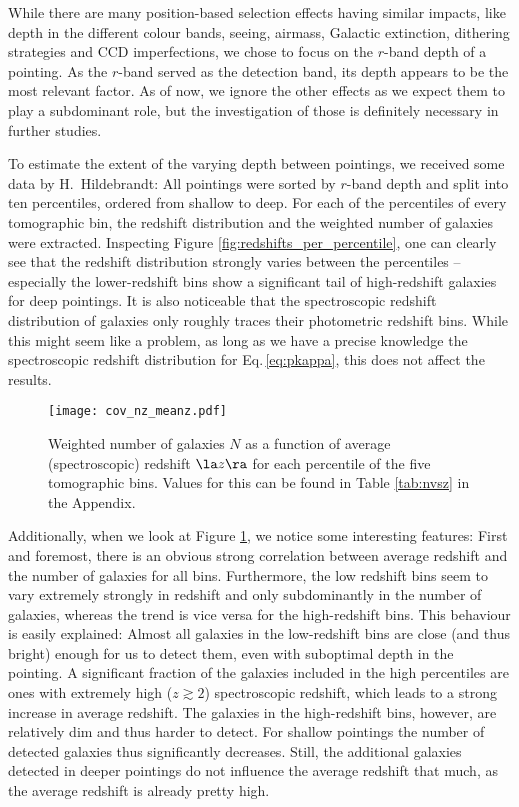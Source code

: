 While there are many position-based selection effects having similar impacts, like depth in the different colour bands, seeing, airmass, Galactic extinction, dithering strategies and CCD imperfections, we chose to focus on the $r$-band depth of a pointing. As the $r$-band served as the detection band, its depth appears to be the most relevant factor. As of now, we ignore the other effects as we expect them to play a subdominant role, but the investigation of those is definitely necessary in further studies.

To estimate the extent of the varying depth between pointings, we received some data by H.~Hildebrandt: All pointings were sorted by $r$-band depth and split into ten percentiles, ordered from shallow to deep. For each of the percentiles of every tomographic bin, the redshift distribution and the weighted number of galaxies were extracted. Inspecting Figure \ref{fig:redshifts_per_percentile}, one can clearly see that the redshift distribution strongly varies between the percentiles -- especially the lower-redshift bins show a significant tail of high-redshift galaxies for deep pointings. It is also noticeable that the spectroscopic redshift distribution of galaxies only roughly traces their photometric redshift bins. While this might seem like a problem, as long as we have a precise knowledge the spectroscopic redshift distribution for Eq.\,\eqref{eq:pkappa}, this does not affect the results. 

\begin{figure}
\centering
\texttt{[image: cov\_nz\_meanz.pdf]}
\caption[Weighted number of galaxies as a function of redshift]{Weighted number of galaxies $N$ as a function of average (spectroscopic) redshift $\la z \ra$ for each percentile of the five tomographic bins. Values for this can be found in Table \ref{tab:nvsz} in the Appendix.}
\label{fig:number_density_vs_redshift}
\end{figure}

Additionally, when we look at Figure \ref{fig:number_density_vs_redshift}, we notice some interesting features: First and foremost, there is an obvious strong correlation between average redshift and the number of galaxies for all bins. Furthermore, the low redshift bins seem to vary extremely strongly in redshift and only subdominantly in the number of galaxies, whereas the trend is vice versa for the high-redshift bins. This behaviour is easily explained: Almost all galaxies in the low-redshift bins are close (and thus bright) enough for us to detect them, even with suboptimal depth in the pointing. A significant fraction of the galaxies included in the high percentiles are ones with extremely high ($z \gtrsim 2$) spectroscopic redshift, which leads to a strong increase in average redshift. The galaxies in the high-redshift bins, however, are relatively dim and thus harder to detect. For shallow pointings the number of detected galaxies thus significantly decreases. Still, the additional galaxies detected in deeper pointings do not influence the average redshift that much, as the average redshift is already pretty high.

